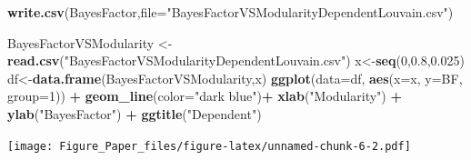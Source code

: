 \documentclass[]{article}
\newenvironment{Shaded}{\begin{snugshade}}{\end{snugshade}}
\newcommand{\KeywordTok}[1]{\textcolor[rgb]{0.13,0.29,0.53}{\textbf{#1}}}
\newcommand{\DataTypeTok}[1]{\textcolor[rgb]{0.13,0.29,0.53}{#1}}
\newcommand{\DecValTok}[1]{\textcolor[rgb]{0.00,0.00,0.81}{#1}}
\newcommand{\FloatTok}[1]{\textcolor[rgb]{0.00,0.00,0.81}{#1}}
\newcommand{\StringTok}[1]{\textcolor[rgb]{0.31,0.60,0.02}{#1}}
\newcommand{\OperatorTok}[1]{\textcolor[rgb]{0.81,0.36,0.00}{\textbf{#1}}}
\newcommand{\NormalTok}[1]{#1}
\begin{document}
\begin{Shaded}
\begin{Highlighting}[]
\KeywordTok{write.csv}\NormalTok{(BayesFactor,}\DataTypeTok{file=}\StringTok{"BayesFactorVSModularityDependentLouvain.csv"}\NormalTok{)}

\NormalTok{BayesFactorVSModularity <-}\StringTok{ }\KeywordTok{read.csv}\NormalTok{(}\StringTok{"BayesFactorVSModularityDependentLouvain.csv"}\NormalTok{)}
\NormalTok{x<-}\KeywordTok{seq}\NormalTok{(}\DecValTok{0}\NormalTok{,}\FloatTok{0.8}\NormalTok{,}\FloatTok{0.025}\NormalTok{)}
\NormalTok{df<-}\KeywordTok{data.frame}\NormalTok{(BayesFactorVSModularity,x)}
\KeywordTok{ggplot}\NormalTok{(}\DataTypeTok{data=}\NormalTok{df, }\KeywordTok{aes}\NormalTok{(}\DataTypeTok{x=}\NormalTok{x, }\DataTypeTok{y=}\NormalTok{BF, }\DataTypeTok{group=}\DecValTok{1}\NormalTok{)) }\OperatorTok{+}
\StringTok{    }\KeywordTok{geom_line}\NormalTok{(}\DataTypeTok{color=}\StringTok{"dark blue"}\NormalTok{)}\OperatorTok{+}
\StringTok{    }\KeywordTok{xlab}\NormalTok{(}\StringTok{"Modularity"}\NormalTok{) }\OperatorTok{+}
\StringTok{    }\KeywordTok{ylab}\NormalTok{(}\StringTok{"BayesFactor"}\NormalTok{) }\OperatorTok{+}
\StringTok{    }\KeywordTok{ggtitle}\NormalTok{(}\StringTok{"Dependent"}\NormalTok{)}
\end{Highlighting}
\end{Shaded}

\texttt{[image: Figure\_Paper\_files/figure-latex/unnamed-chunk-6-2.pdf]}
\end{document}
